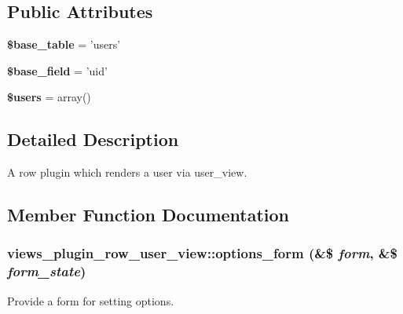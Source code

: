 \subsection*{Public Attributes}
\begin{DoxyCompactItemize}
\item 
\hypertarget{classviews__plugin__row__user__view_a64c6fa81d603ea99cf220faf2b71a9f0}{
{\bfseries \$base\_\-table} = 'users'}
\label{classviews__plugin__row__user__view_a64c6fa81d603ea99cf220faf2b71a9f0}

\item 
\hypertarget{classviews__plugin__row__user__view_adcce89a5e5d2b8bc96bf195c1d9cacd9}{
{\bfseries \$base\_\-field} = 'uid'}
\label{classviews__plugin__row__user__view_adcce89a5e5d2b8bc96bf195c1d9cacd9}

\item 
\hypertarget{classviews__plugin__row__user__view_a9f7c3a24c84f5a8addc3c13dc9312d5c}{
{\bfseries \$users} = array()}
\label{classviews__plugin__row__user__view_a9f7c3a24c84f5a8addc3c13dc9312d5c}

\end{DoxyCompactItemize}


\subsection{Detailed Description}
A row plugin which renders a user via user\_\-view. 

\subsection{Member Function Documentation}
\hypertarget{classviews__plugin__row__user__view_a3e0109e3008d06d56386d8aba10147c3}{
\subsubsection[{options\_\-form}]{\setlength{\rightskip}{0pt plus 5cm}views\_\-plugin\_\-row\_\-user\_\-view::options\_\-form (\&\$ {\em form}, \/  \&\$ {\em form\_\-state})}}
\label{classviews__plugin__row__user__view_a3e0109e3008d06d56386d8aba10147c3}
Provide a form for setting options. 

